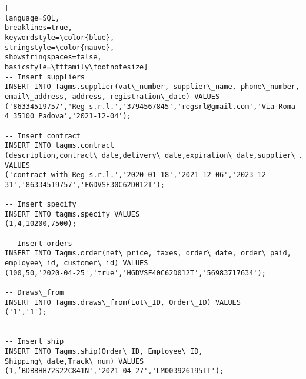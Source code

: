 \begin{lstlisting}[
language=SQL,
breaklines=true,
keywordstyle=\color{blue},
stringstyle=\color{mauve},
showstringspaces=false,
basicstyle=\ttfamily\footnotesize]
-- Insert suppliers
INSERT INTO Tagms.supplier(vat\_number, supplier\_name, phone\_number, email\_address, address, registration\_date) VALUES
('86334519757','Reg s.r.l.','3794567845','regsrl@gmail.com','Via Roma 4 35100 Padova','2021-12-04');

-- Insert contract
INSERT INTO tagms.contract (description,contract\_date,delivery\_date,expiration\_date,supplier\_id,employee\_id) VALUES
('contract with Reg s.r.l.','2020-01-18','2021-12-06','2023-12-31','86334519757','FGDVSF30C62D012T');

-- Insert specify
INSERT INTO tagms.specify VALUES
(1,4,10200,7500);

-- Insert orders
INSERT INTO Tagms.order(net\_price, taxes, order\_date, order\_paid, employee\_id, customer\_id) VALUES
(100,50,’2020-04-25','true','HGDVSF40C62D012T','56983717634');

-- Draws\_from
INSERT INTO Tagms.draws\_from(Lot\_ID, Order\_ID) VALUES
('1','1');


-- Insert ship
INSERT INTO Tagms.ship(Order\_ID, Employee\_ID, Shipping\_date,Track\_num) VALUES
(1,’BDBBHH72S22C841N','2021-04-27','LM003926195IT');

\end{lstlisting}